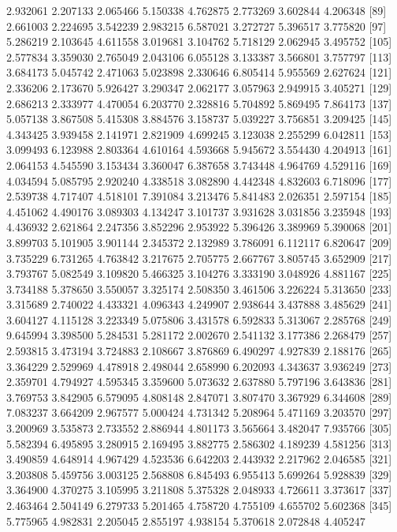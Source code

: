 \documentclass[12pt]{article}
\begin{document}
\begin{Schunk}
\begin{Soutput}
 [81] 2.932061 2.207133 2.065466 5.150338 4.762875 2.773269 3.602844 4.206348
 [89] 2.661003 2.224695 3.542239 2.983215 6.587021 3.272727 5.396517 3.775820
 [97] 5.286219 2.103645 4.611558 3.019681 3.104762 5.718129 2.062945 3.495752
[105] 2.577834 3.359030 2.765049 2.043106 6.055128 3.133387 3.566801 3.757797
[113] 3.684173 5.045742 2.471063 5.023898 2.330646 6.805414 5.955569 2.627624
[121] 2.336206 2.173670 5.926427 3.290347 2.062177 3.057963 2.949915 3.405271
[129] 2.686213 2.333977 4.470054 6.203770 2.328816 5.704892 5.869495 7.864173
[137] 5.057138 3.867508 5.415308 3.884576 3.158737 5.039227 3.756851 3.209425
[145] 4.343425 3.939458 2.141971 2.821909 4.699245 3.123038 2.255299 6.042811
[153] 3.099493 6.123988 2.803364 4.610164 4.593668 5.945672 3.554430 4.204913
[161] 2.064153 4.545590 3.153434 3.360047 6.387658 3.743448 4.964769 4.529116
[169] 4.034594 5.085795 2.920240 4.338518 3.082890 4.442348 4.832603 6.718096
[177] 2.539738 4.717407 4.518101 7.391084 3.213476 5.841483 2.026351 2.597154
[185] 4.451062 4.490176 3.089303 4.134247 3.101737 3.931628 3.031856 3.235948
[193] 4.436932 2.621864 2.247356 3.852296 2.953922 5.396426 3.389969 5.390068
[201] 3.899703 5.101905 3.901144 2.345372 2.132989 3.786091 6.112117 6.820647
[209] 3.735229 6.731265 4.763842 3.217675 2.705775 2.667767 3.805745 3.652909
[217] 3.793767 5.082549 3.109820 5.466325 3.104276 3.333190 3.048926 4.881167
[225] 3.734188 5.378650 3.550057 3.325174 2.508350 3.461506 3.226224 5.313650
[233] 3.315689 2.740022 4.433321 4.096343 4.249907 2.938644 3.437888 3.485629
[241] 3.604127 4.115128 3.223349 5.075806 3.431578 6.592833 5.313067 2.285768
[249] 9.645994 3.398500 5.284531 5.281172 2.002670 2.541132 3.177386 2.268479
[257] 2.593815 3.473194 3.724883 2.108667 3.876869 6.490297 4.927839 2.188176
[265] 3.364229 2.529969 4.478918 2.498044 2.658990 6.202093 4.343637 3.936249
[273] 2.359701 4.794927 4.595345 3.359600 5.073632 2.637880 5.797196 3.643836
[281] 3.769753 3.842905 6.579095 4.808148 2.847071 3.807470 3.367929 6.344608
[289] 7.083237 3.664209 2.967577 5.000424 4.731342 5.208964 5.471169 3.203570
[297] 3.200969 3.535873 2.733552 2.886944 4.801173 3.565664 3.482047 7.935766
[305] 5.582394 6.495895 3.280915 2.169495 3.882775 2.586302 4.189239 4.581256
[313] 3.490859 4.648914 4.967429 4.523536 6.642203 2.443932 2.217962 2.046585
[321] 3.203808 5.459756 3.003125 2.568808 6.845493 6.955413 5.699264 5.928839
[329] 3.364900 4.370275 3.105995 3.211808 5.375328 2.048933 4.726611 3.373617
[337] 2.463464 2.504149 6.279733 5.201465 4.758720 4.755109 4.655702 5.602368
[345] 5.775965 4.982831 2.205045 2.855197 4.938154 5.370618 2.072848 4.405247

\end{Soutput}
\end{Schunk}
\end{document}
